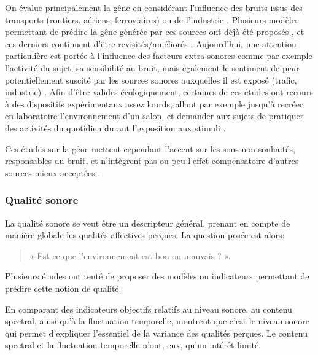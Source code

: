 
On évalue principalement la gêne en considérant l'influence des bruits issus des transports (routiers, aériens, ferroviaires) ou de l'industrie  \citep{gille2016noise,gille2016dose,trolle2015perception,klein2015spectral}. Plusieurs modèles permettant de prédire la gêne générée par ces sources ont déjà été proposés \citep{miedema2001annoyance,miedema2004relationship}, et ces derniers continuent d'être revisités/améliorés \citep{gille2016testing}. Aujourd'hui, une attention particulière est portée à l'influence des facteurs extra-sonores comme par exemple l'activité du sujet, sa sensibilité au bruit, mais également le sentiment de peur potentiellement suscité par les sources sonores auxquelles il est exposé (trafic, industrie) \citep{marquis2015simulated,morel2016noise}. Afin d'être valides écologiquement, certaines de ces études ont recours à des dispositifs expérimentaux assez lourds, allant par exemple jusqu'à recréer en laboratoire l'environnement d'un salon, et demander aux sujets de pratiquer des activités du quotidien durant l'exposition aux stimuli \citep{marquis2015simulated}.

Ces études sur la gêne mettent cependant l'accent sur les sons non-souhaités, responsables du bruit, et n'intègrent pas ou peu l'effet compensatoire d'autres sources mieux acceptées \citep{aletta2016soundscape}.

\subsubsection{Qualité sonore}

La qualité sonore se veut être un descripteur général, prenant en compte de manière globale les qualités affectives perçues. La question posée est alors:

\begin{quote}
« Est-ce que l'environnement est bon ou mauvais ? ».
\end{quote}

 
Plusieurs études ont tenté de proposer des modèles ou indicateurs permettant de prédire cette notion de qualité.

En comparant des indicateurs objectifs relatifs au niveau sonore, au contenu spectral, ainsi qu'à la fluctuation temporelle, \citep{nilsson2006soundscape,nilsson2007acoustic} montrent que c'est le niveau sonore qui permet d'expliquer l'essentiel de la variance des qualités perçues. Le contenu spectral et la fluctuation temporelle n'ont, eux, qu'un intérêt limité.

